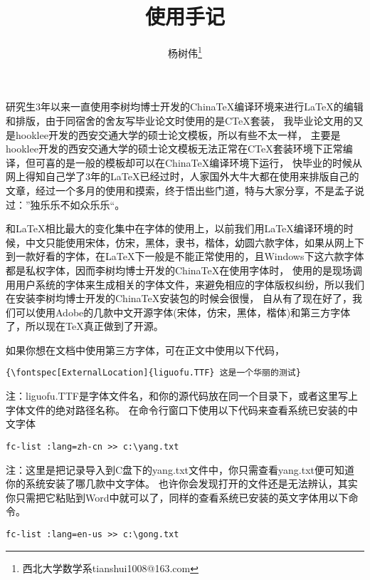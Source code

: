 \documentclass[12pt,a4paper]{article}
\begin{document}
\pagestyle{yang}
\title{\XeLaTeX 使用手记}
\author{杨树伟\thanks{西北大学数学系tianshui1008@163.com}
}
\maketitle

研究生3年以来一直使用李树均博士开发的ChinaTeX编译环境来进行\LaTeX 的编辑和排版，由于同宿舍的舍友写毕业论文时使用的是CTeX套装，
我毕业论文用的又是hooklee开发的西安交通大学的硕士论文模板，所以有些不太一样，
主要是hooklee开发的西安交通大学的硕士论文模板无法正常在CTeX套装环境下正常编译，但可喜的是一般的模板却可以在ChinaTeX编译环境下运行，
快毕业的时候从网上得知自己学了3年的\LaTeX 已经过时，人家国外大牛大都在使用\XeLaTeX 来排版自己的文章，经过一个多月的使用和摸索，终于悟出些门道，特与大家分享，不是孟子说过：”独乐乐不如众乐乐“。


和\LaTeX 相比\XeLaTeX 最大的变化集中在字体的使用上，以前我们用\LaTeX 编译环境的时候，中文只能使用宋体，仿宋，黑体，隶书，楷体，幼圆六款字体，如果从网上下到一款好看的字体，在\LaTeX 下一般是不能正常使用的，且Windows下这六款字体都是私权字体，因而李树均博士开发的ChinaTeX在使用字体时，
使用的是现场调用用户系统的字体来生成相关的字体文件，来避免相应的字体版权纠纷，所以我们在安装李树均博士开发的ChinaTeX安装包的时候会很慢，
自从有了\XeLaTeX 现在好了，我们可以使用Adobe的几款中文开源字体(宋体，仿宋，黑体，楷体)和第三方字体了，所以现在\TeX 真正做到了开源。

如果你想在文档中使用第三方字体，可在正文中使用以下代码，
\begin{verbatim}
{\fontspec[ExternalLocation]{liguofu.TTF} 这是一个华丽的测试}
\end{verbatim}
注：{liguofu.TTF}是字体文件名，和你的源代码放在同一个目录下，或者这里写上字体文件的绝对路径名称。
在命令行窗口下使用以下代码来查看系统已安装的中文字体
\begin{verbatim}
fc-list :lang=zh-cn >> c:\yang.txt
\end{verbatim}
注：这里是把记录导入到C盘下的yang.txt文件中，你只需查看yang.txt便可知道你的系统安装了哪几款中文字体。
也许你会发现打开的文件还是无法辨认，其实你只需把它粘贴到Word中就可以了，同样的查看系统已安装的英文字体用以下命令。
\begin{verbatim}
fc-list :lang=en-us >> c:\gong.txt
\end{verbatim}
\end{document}

